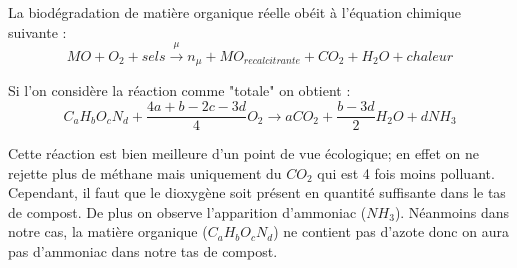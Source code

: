 \documentclass[../PS6_RapportFinal.tex]{subfiles}
\begin{document}
La biodégradation de matière organique réelle obéit à l’équation chimique suivante :
\[MO + O_2 + sels \stackrel{\mu}{\longrightarrow} n_\mu + MO_{recalcitrante} +CO_2 +H_2O + chaleur\]

Si l’on considère la réaction comme "totale" on obtient :
\[C_aH_bO_cN_d + \frac{4a + b - 2c -3d}{4}O_2 \longrightarrow aCO_2+ \frac{b-3d}{2} H_2O + dNH_3\]

Cette réaction est bien meilleure d'un point de vue écologique; en effet on ne rejette plus de méthane mais uniquement du \(CO_{2}\) qui est 4 fois moins polluant. Cependant, il faut que le dioxygène soit présent en quantité suffisante dans le tas de compost. De plus on observe l'apparition d'ammoniac (\(NH_{3}\)). Néanmoins dans notre cas, la matière organique (\(C_aH_bO_cN_d\)) ne contient pas d'azote donc on aura pas d'ammoniac dans notre tas de compost.
\end{document}
